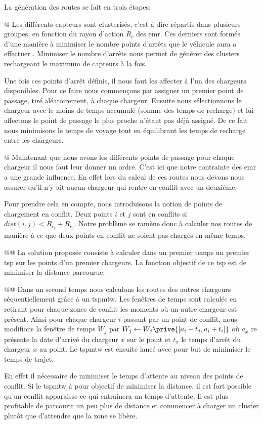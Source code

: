 \documentclass[final]{polytech/polytech}
\begin{document}
		La génération des routes se fait en trois étapes:
	
		\begin{easylist}[itemize]
			@ Les différents capteurs sont clusterisés, c'est à dire répartis dans plusieurs groupes, en fonction du rayon d'action $R_c$ des \gls{emr}.
			Ces derniers sont formés d'une manière à minimiser le nombre points d'arrêts que le véhicule aura a effectuer \cite{KHELLADI201744}.
			Minimiser le nombre d'arrêts nous permet de générer des clusters rechargeant le maximum de capteurs à la fois.
			
			Une fois ces points d'arrêt définis, il nous faut les affecter à l'un des chargeurs disponibles.
			Pour ce faire nous commençons par assigner un premier point de passage, tiré aléatoirement, à chaque chargeur.
			Ensuite nous sélectionnons le chargeur avec le moins de temps accumulé (somme des temps de recharge) et lui affectons le point de passage le plus proche n'étant pas déjà assigné.
			De ce fait nous minimisons le temps de voyage tout en équilibrant les temps de recharge entre les chargeurs.
			
			@ Maintenant que nous avons les différents points de passage pour chaque chargeur il nous faut leur donner un ordre.
			C'est ici que notre contrainte des \gls{emr} a une grande influence.
			En effet lors du calcul de ces routes nous devons nous assurer qu'il n'y ait aucun chargeur qui rentre en conflit avec un deuxième.
			
			Pour prendre cela en compte, nous introduisons la notion de points de chargement en conflit.
			Deux points $i$ et $j$ sont en conflits si $dist\left(i,j\right)<R_{c_i}+R_{c_j}$.
			Notre problème se ramène donc à calculer nos routes de manière à ce que deux points en conflit ne soient pas chargés en même temps.
			
			@@ La solution proposée consiste à calculer dans un premier temps un premier \gls{tsp} sur les points d'un premier chargeurs.
			La fonction objectif de ce \gls{tsp} est de minimiser la distance parcourue.
			
			@@ Dans un second temps nous calculons les routes des autres chargeurs séquentiellement grâce à un \gls{tspmtw}.
			Les fenêtres de temps sont calculés en retirant pour chaque zones de conflit les moments où un autre chargeur est présent.
			Ainsi pour chaque chargeur $i$ passant par un point de conflit, nous modifions la fenêtre de temps $W_j$ par $W_j\leftarrow W_j\prive{\left[a_i-t_j, a_i+t_i\right]}$ où $a_x$ re présente la date d'arrivé du chargeur $x$ sur le point et $t_x$ le temps d'arrêt du chargeur $x$ au point.
			Le \gls{tspmtw} est ensuite lancé avec pour but de minimiser le temps de trajet.
			
			En effet il nécessaire de minimiser le temps d'attente au niveau des points de conflit.
			Si le \gls{tspmtw} à pour objectif de minimiser la distance, il est fort possible qu'un conflit apparaisse ce qui entrainera un temps d'attente.
			Il est plus profitable de parcourir un peu plus de distance et commencer à charger un cluster plutôt que d'attendre que la zone se libère.
		\end{easylist}
		
\end{document}
